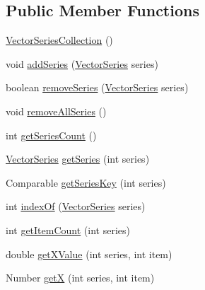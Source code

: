 \subsection*{Public Member Functions}
\begin{DoxyCompactItemize}
\item 
\mbox{\hyperlink{classorg_1_1jfree_1_1data_1_1xy_1_1_vector_series_collection_a24e9e816014cc1a6010370efd6fd75f3}{Vector\+Series\+Collection}} ()
\item 
void \mbox{\hyperlink{classorg_1_1jfree_1_1data_1_1xy_1_1_vector_series_collection_a3e60d6c169801c98f51b68780fb70844}{add\+Series}} (\mbox{\hyperlink{classorg_1_1jfree_1_1data_1_1xy_1_1_vector_series}{Vector\+Series}} series)
\item 
boolean \mbox{\hyperlink{classorg_1_1jfree_1_1data_1_1xy_1_1_vector_series_collection_aa331b56af7525788c693bce1bb1b1ca7}{remove\+Series}} (\mbox{\hyperlink{classorg_1_1jfree_1_1data_1_1xy_1_1_vector_series}{Vector\+Series}} series)
\item 
void \mbox{\hyperlink{classorg_1_1jfree_1_1data_1_1xy_1_1_vector_series_collection_a3c8e244aa75b89e174a0f87ae867d2f8}{remove\+All\+Series}} ()
\item 
int \mbox{\hyperlink{classorg_1_1jfree_1_1data_1_1xy_1_1_vector_series_collection_ad7e902eb4447d1f31fb900fab80157b8}{get\+Series\+Count}} ()
\item 
\mbox{\hyperlink{classorg_1_1jfree_1_1data_1_1xy_1_1_vector_series}{Vector\+Series}} \mbox{\hyperlink{classorg_1_1jfree_1_1data_1_1xy_1_1_vector_series_collection_a25bcb72f6c5f64dd673887d056cef34d}{get\+Series}} (int series)
\item 
Comparable \mbox{\hyperlink{classorg_1_1jfree_1_1data_1_1xy_1_1_vector_series_collection_a228ffe9cdfe7b8b0736b9e65bccc0057}{get\+Series\+Key}} (int series)
\item 
int \mbox{\hyperlink{classorg_1_1jfree_1_1data_1_1xy_1_1_vector_series_collection_a17de82ccda62473f83a224839c2a70ff}{index\+Of}} (\mbox{\hyperlink{classorg_1_1jfree_1_1data_1_1xy_1_1_vector_series}{Vector\+Series}} series)
\item 
int \mbox{\hyperlink{classorg_1_1jfree_1_1data_1_1xy_1_1_vector_series_collection_a69a6b517673d0152e060d616742931cc}{get\+Item\+Count}} (int series)
\item 
double \mbox{\hyperlink{classorg_1_1jfree_1_1data_1_1xy_1_1_vector_series_collection_a94c0b22e67110c43fb565a756b1c89e9}{get\+X\+Value}} (int series, int item)
\item 
Number \mbox{\hyperlink{classorg_1_1jfree_1_1data_1_1xy_1_1_vector_series_collection_ad7741f58379e334e2e027b5c0446fd45}{getX}} (int series, int item)

\end{DoxyCompactItemize}

